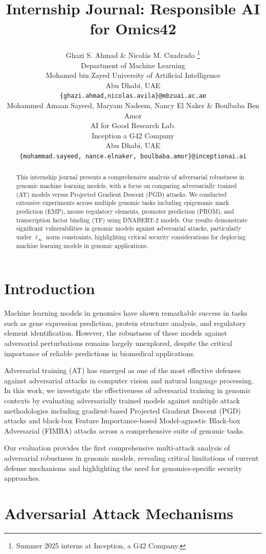 \documentclass{article} %
\title{Internship Journal: Responsible AI for Omics42}
\author{Ghazi S. Ahmad \& Nicolás M. Cuadrado \thanks{Summer 2025 interns at Inception, a G42 Company.} \\
    Department of Machine Learning\\
    Mohamed bin Zayed University of Artificial Intelligence\\
    Abu Dhabi, UAE \\
    \texttt{\{ghazi.ahmad,nicolas.avila\}@mbzuai.ac.ae} \\
    \AND
    Mohammed Amaan Sayeed, Maryam Nadeem, Nancy El Naker \& Boulbaba Ben Amor \\
    AI for Good Research Lab.\\
    Inception a G42 Company \\
    Abu Dhabi, UAE \\
    \texttt{\{mohammad.sayeed, nance.elnaker, boulbaba.amor\}@inceptionai.ai} \\
    }
\begin{document}
\maketitle

\begin{abstract}
This internship journal presents a comprehensive analysis of adversarial robustness in genomic machine learning models, with a focus on comparing adversarially trained (AT) models versus Projected Gradient Descent (PGD) attacks. We conducted extensive experiments across multiple genomic tasks including epigenomic mark prediction (EMP), mouse regulatory elements, promoter prediction (PROM), and transcription factor binding (TF) using DNABERT-2 models. Our results demonstrate significant vulnerabilities in genomic models against adversarial attacks, particularly under $\ell_\infty$ norm constraints, highlighting critical security considerations for deploying machine learning models in genomic applications.
\end{abstract}

\section{Introduction}

Machine learning models in genomics have shown remarkable success in tasks such as gene expression prediction, protein structure analysis, and regulatory element identification. However, the robustness of these models against adversarial perturbations remains largely unexplored, despite the critical importance of reliable predictions in biomedical applications.

Adversarial training (AT) has emerged as one of the most effective defenses against adversarial attacks in computer vision and natural language processing. In this work, we investigate the effectiveness of adversarial training in genomic contexts by evaluating adversarially trained models against multiple attack methodologies including gradient-based Projected Gradient Descent (PGD) attacks and black-box Feature Importance-based Model-agnostic Black-box Adversarial (FIMBA) attacks across a comprehensive suite of genomic tasks.

Our evaluation provides the first comprehensive multi-attack analysis of adversarial robustness in genomic models, revealing critical limitations of current defense mechanisms and highlighting the need for genomics-specific security approaches.

\section{Adversarial Attack Mechanisms}
\end{document}
